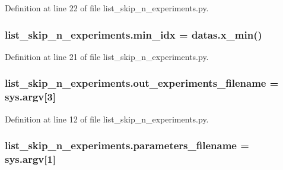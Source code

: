 Definition at line 22 of file list\+\_\+skip\+\_\+n\+\_\+experiments.\+py.

\subsubsection[{\texorpdfstring{min\+\_\+idx}{min_idx}}]{\setlength{\rightskip}{0pt plus 5cm}list\+\_\+skip\+\_\+n\+\_\+experiments.\+min\+\_\+idx = datas.\+x\+\_\+min()}\hypertarget{namespacelist__skip__n__experiments_a1469c5c024e30fd45f71256f1bf9de65}{}\label{namespacelist__skip__n__experiments_a1469c5c024e30fd45f71256f1bf9de65}


Definition at line 21 of file list\+\_\+skip\+\_\+n\+\_\+experiments.\+py.

\subsubsection[{\texorpdfstring{out\+\_\+experiments\+\_\+filename}{out_experiments_filename}}]{\setlength{\rightskip}{0pt plus 5cm}list\+\_\+skip\+\_\+n\+\_\+experiments.\+out\+\_\+experiments\+\_\+filename = sys.\+argv\mbox{[}3\mbox{]}}\hypertarget{namespacelist__skip__n__experiments_aa6076cc866fef80f0751f37c54685ea9}{}\label{namespacelist__skip__n__experiments_aa6076cc866fef80f0751f37c54685ea9}


Definition at line 12 of file list\+\_\+skip\+\_\+n\+\_\+experiments.\+py.

\subsubsection[{\texorpdfstring{parameters\+\_\+filename}{parameters_filename}}]{\setlength{\rightskip}{0pt plus 5cm}list\+\_\+skip\+\_\+n\+\_\+experiments.\+parameters\+\_\+filename = sys.\+argv\mbox{[}1\mbox{]}}\hypertarget{namespacelist__skip__n__experiments_ae7d7e751880714692ef0ba6f35163da3}{}\label{namespacelist__skip__n__experiments_ae7d7e751880714692ef0ba6f35163da3}


